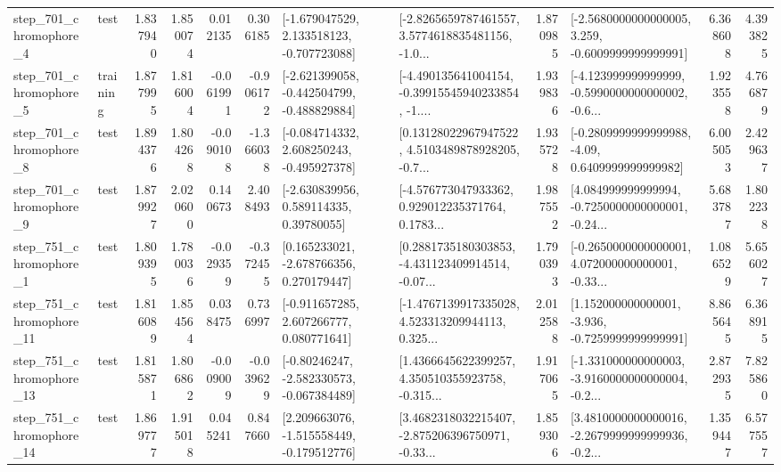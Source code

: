 \begin{tabular}{llrrrrllrlrr}
   step\_701\_chromophore\_4 &      test &      1.837940 &    1.850074 &      0.012135 &  0.306185 &   [-1.679047529, 2.133518123, -0.707723088] &  [-2.8265659787461557, 3.5774618835481156, -1.0... &       1.870985 &  [-2.5680000000000005, 3.259, -0.6009999999999991] &            6.368608 &          4.393825 \\
   step\_701\_chromophore\_5 &  training &      1.877995 &    1.816004 &     -0.061991 & -0.906172 &  [-2.621399058, -0.442504799, -0.488829884] &  [-4.490135641004154, -0.39915545940233854, -1.... &       1.939836 &  [-4.123999999999999, -0.5990000000000002, -0.6... &            1.923558 &          4.766879 \\
   step\_701\_chromophore\_8 &      test &      1.894376 &    1.804268 &     -0.090108 & -1.366038 &   [-0.084714332, 2.608250243, -0.495927378] &  [0.13128022967947522, 4.5103489878928205, -0.7... &       1.935728 &   [-0.2809999999999988, -4.09, 0.6409999999999982] &            6.005053 &          2.429637 \\
   step\_701\_chromophore\_9 &      test &      1.879927 &    2.020600 &      0.140673 &  2.408493 &     [-2.630839956, 0.589114335, 0.39780055] &  [-4.576773047933362, 0.929012235371764, 0.1783... &       1.987552 &  [4.084999999999994, -0.7250000000000001, -0.24... &            5.683787 &          1.802238 \\
   step\_751\_chromophore\_1 &      test &      1.809395 &    1.780036 &     -0.029359 & -0.372455 &    [0.165233021, -2.678766356, 0.270179447] &  [0.2881735180303853, -4.431123409914514, -0.07... &       1.790393 &  [-0.2650000000000001, 4.072000000000001, -0.33... &            1.086529 &          5.656027 \\
  step\_751\_chromophore\_11 &      test &      1.816089 &    1.854564 &      0.038475 &  0.736997 &    [-0.911657285, 2.607266777, 0.080771641] &  [-1.4767139917335028, 4.523313209944113, 0.325... &       2.012588 &   [1.152000000000001, -3.936, -0.7259999999999991] &            8.865645 &          6.368915 \\
  step\_751\_chromophore\_13 &      test &      1.815871 &    1.806862 &     -0.009009 & -0.039629 &   [-0.80246247, -2.582330573, -0.067384489] &  [1.4366645622399257, 4.350510355923758, -0.315... &       1.917065 &  [-1.331000000000003, -3.9160000000000004, -0.2... &            2.872935 &          7.825860 \\
  step\_751\_chromophore\_14 &      test &      1.869777 &    1.915018 &      0.045241 &  0.847660 &   [2.209663076, -1.515558449, -0.179512776] &  [3.4682318032215407, -2.875206396750971, -0.33... &       1.859306 &  [3.4810000000000016, -2.2679999999999936, -0.2... &            1.359447 &          6.577557 \\

\end{tabular}
